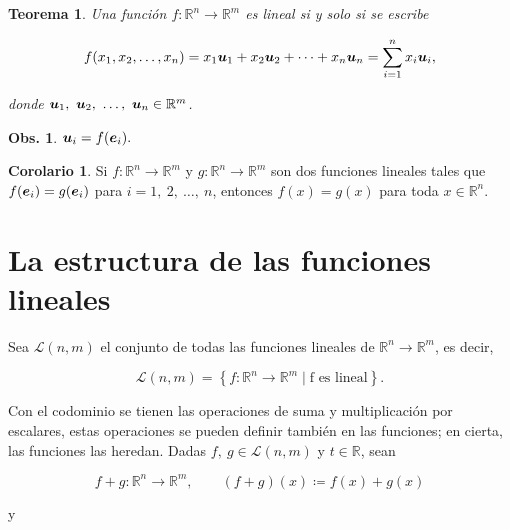 \documentclass{article}
\theoremstyle{definicion}
\theoremstyle{definition}             %
\theoremstyle{definition}             %
\theoremstyle{definition}
\theoremstyle{definition}
\theoremstyle{observacion}
\newtheorem{obs}{Obs.}
\theoremstyle{definition}
\theoremstyle{plain}
\newtheorem{theorem}{Teorema}
\theoremstyle{definition}
\theoremstyle{afirmacion}
\newtheorem{corollary}{Corolario}
\theoremstyle{notation}
\theoremstyle{definition}
\begin{document}
    \begin{theorem}
        Una función \(f \colon \mathbb{R}^{n} \to \mathbb{R}^{m}\) es lineal si y solo si se escribe

        \begin{equation*}
            f(x_{1}, x_{2}, \dots, x_{n}) = x_{1}\vb*{u}_{1} + x_{2}\vb*{u}_{2} + \cdots + x_{n}\vb*{u}_{n} = \sum_{i = 1}^{n} x_{i} \vb*{u}_{i},
        \end{equation*}

        donde \(\vb*{u}_{1},\ \vb*{u}_{2},\ \dots,\ \vb*{u}_{n}\in\mathbb{R}^{m}\).
    \end{theorem}

    \begin{obs}
        \(\vb*{u}_{i} = f(\vb*{e}_{i}).\)
    \end{obs}

    \begin{corollary}
        Si \(f \colon \mathbb{R}^{n} \to \mathbb{R}^{m}\) y \(g \colon \mathbb{R}^{n} \to \mathbb{R}^{m}\) son dos funciones lineales tales que \(f(\vb*{e}_{i}) = g(\vb*{e}_{i})\) para \(i = 1,\ 2,\ \dots,\ n\), entonces \(f(x) = g(x)\) para toda \(x\in\mathbb{R}^{n}\).
    \end{corollary}

    \section{La estructura de las funciones lineales}

    Sea  \(\mathcal{L}(n, m)\) el conjunto de todas las funciones lineales de \(\mathbb{R}^{n} \to \mathbb{R}^{m}\), es decir,

    \begin{equation*}
        \mathcal{L}(n, m) = \left\lbrace f \colon \mathbb{R}^{n} \to \mathbb{R}^{m} \mid \text{f es lineal}\right\rbrace.
    \end{equation*}

    Con el codominio se tienen las operaciones de suma y multiplicación por escalares, estas operaciones se pueden definir también en las funciones; en cierta, las funciones las heredan. Dadas \(f,\ g \in \mathcal{L}(n, m)\) y \(t\in\mathbb{R}\), sean

    \begin{equation*}
        f + g \colon \mathbb{R}^{n} \to \mathbb{R}^{m}, \qquad (f + g)(x) \coloneq f(x) + g(x)
    \end{equation*}

    y
\end{document}

